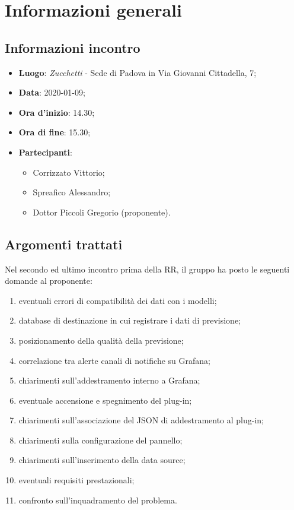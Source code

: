 \section{Informazioni generali}
    \subsection{Informazioni incontro}
        \begin{itemize}
            \item \textbf{Luogo}: \textit{Zucchetti} - Sede di Padova in Via Giovanni Cittadella, 7;
            \item \textbf{Data}: 2020-01-09;
            \item \textbf{Ora d'inizio}: 14.30;
            \item \textbf{Ora di fine}: 15.30;
            \item \textbf{Partecipanti}: \begin{itemize}
                \item Corrizzato Vittorio;
                \item Spreafico Alessandro;
                \item Dottor Piccoli Gregorio (proponente).
            \end{itemize}
        \end{itemize}
    \subsection{Argomenti trattati}
        Nel secondo ed ultimo incontro prima della RR, il gruppo ha posto le seguenti domande al proponente:
        \begin{enumerate}
            \item eventuali errori di compatibilità dei dati con i modelli;
            \item database di destinazione in cui registrare i dati di previsione;
            \item posizionamento della qualità della previsione;
            \item correlazione tra alert\glosp e canali di notifiche su Grafana\glo;
            \item chiarimenti sull'addestramento interno a Grafana\glo;
            \item eventuale accensione e spegnimento del plug-in;
            \item chiarimenti sull'associazione del JSON di addestramento al plug-in;
            \item chiarimenti sulla configurazione del pannello;
            \item chiarimenti sull'inserimento della data source;
            \item eventuali requisiti prestazionali;
            \item confronto sull'inquadramento del problema.
        \end{enumerate}
